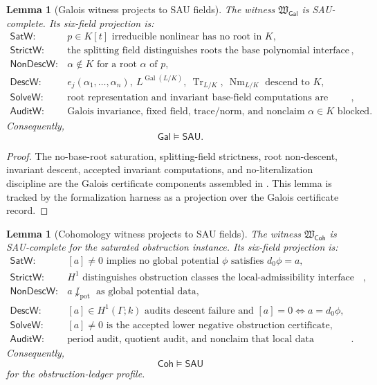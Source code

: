 \documentclass[11pt]{article}
\newcommand{\SAU}{\mathsf{SAU}}
\newcommand{\Galois}{\mathsf{Gal}}
\newcommand{\Coh}{\mathsf{Coh}}
\newcommand{\Gal}{\operatorname{Gal}}
\newcommand{\Tr}{\operatorname{Tr}}
\newcommand{\Nm}{\operatorname{Nm}}
\newtheorem{lemma}[theorem]{Lemma}
\theoremstyle{definition}
\begin{document}
\begin{lemma}[Galois witness projects to SAU fields]
\label{lem:sau-cross-gal-fields}
The witness \(\mathfrak W_{\Galois}\) is SAU-complete.  Its six-field projection is:
\[
\begin{array}{ll}
\mathsf{SatW}:& p\in K[t]\text{ irreducible nonlinear has no root in }K,\\[1mm]
\mathsf{StrictW}:& \text{the splitting field distinguishes roots the base polynomial interface collapses},\\[1mm]
\mathsf{NonDescW}:& \alpha\notin K\text{ for a root }\alpha\text{ of }p,\\[1mm]
\mathsf{DescW}:& e_j(\alpha_1,\ldots,\alpha_n),\ L^{\Gal(L/K)},\ \Tr_{L/K},\ \Nm_{L/K}\text{ descend to }K,\\[1mm]
\mathsf{SolveW}:& \text{root representation and invariant base-field computations are supplied upstairs},\\[1mm]
\mathsf{AuditW}:& \text{Galois invariance, fixed field, trace/norm, and nonclaim }\alpha\in K\text{ blocked}.
\end{array}
\]
Consequently,
\[
\Galois\models\SAU.
\]
\end{lemma}

\begin{proof}
The no-base-root saturation, splitting-field strictness, root non-descent,
invariant descent, accepted invariant computations, and no-literalization
discipline are the Galois certificate components assembled in
.  This lemma is tracked by the formalization harness as a
projection over the Galois certificate record.
\end{proof}

\begin{lemma}[Cohomology witness projects to SAU fields]
\label{lem:sau-cross-coh-fields}
The witness \(\mathfrak W_{\Coh}\) is SAU-complete for the saturated obstruction instance.  Its six-field projection is:
\[
\begin{array}{ll}
\mathsf{SatW}:& [a]\neq0\text{ implies no global potential }\phi\text{ satisfies }d_0\phi=a,\\[1mm]
\mathsf{StrictW}:& H^1\text{ distinguishes obstruction classes the local-admissibility interface collapses},\\[1mm]
\mathsf{NonDescW}:& a\not\downarrow_{\mathrm{pot}}\text{ as global potential data},\\[1mm]
\mathsf{DescW}:& [a]\in H^1(\Gamma;k)\text{ audits descent failure and }[a]=0\iff a=d_0\phi,\\[1mm]
\mathsf{SolveW}:& [a]\neq0\text{ is the accepted lower negative obstruction certificate},\\[1mm]
\mathsf{AuditW}:& \text{period audit, quotient audit, and nonclaim that local data automatically glues}.
\end{array}
\]
Consequently,
\[
\Coh\models\SAU
\]
for the obstruction-ledger profile.
\end{lemma}
\end{document}
